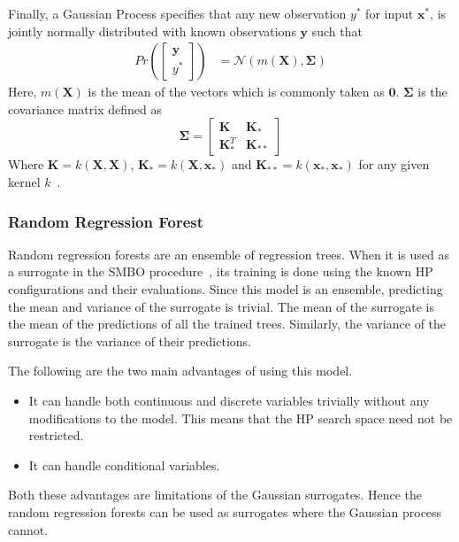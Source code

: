 \documentclass[12pt, twoside, ngerman]{report}
\begin{document}
Finally,  a Gaussian Process specifies that any new observation $y^*$ for input $\textbf{x}^*$,  is jointly normally distributed with known observations $\textbf{y}$ such that
\begin{align}
    Pr\left( \begin{bmatrix}
           \textbf{y} \\
           y^*
         \end{bmatrix}
         \right)
         &=  \mathcal{N}\left(m(\textbf{X}), \mathbf{\Sigma}\right)
\end{align}
Here, $m(\textbf{X})$ is the mean of the vectors which is commonly taken as $\textbf{0}$.
$\mathbf{\Sigma}$ is the covariance matrix defined as
$$
\mathbf{\Sigma} = \begin{bmatrix}
           \textbf{K} & \textbf{K}_* \\
           \textbf{K}_*^T & \textbf{K}_{**}
         \end{bmatrix}
$$
  Where $\textbf{K} = k(\textbf{X}, \textbf{X})$,  $\textbf{K}_*  =  k(\textbf{X}, \textbf{x}_*)$ and $\textbf{K}_{**} = k(\textbf{x}_*,  \textbf{x}_*)$ for any given kernel $k$~\cite{GPTutorial}.

\subsubsection{Random Regression Forest}
Random regression forests are an ensemble of regression trees.
When it is used as a surrogate in the SMBO procedure~\cite{SMBOPaper},  its training is done using the known HP configurations and their evaluations.
Since this model is an ensemble, predicting the mean and variance of the surrogate is trivial. The mean of the surrogate is the mean of the predictions of all the trained trees. Similarly, the variance of the surrogate is the variance of their predictions.

The following are the two main advantages of using this model.
\begin{itemize}
\item It can handle both continuous and discrete variables trivially without any modifications to the model. This means that the HP search space need not be restricted.
\item It can handle conditional variables.
\end{itemize}

Both these advantages are limitations of the Gaussian surrogates. Hence the random regression forests can be used as surrogates where the Gaussian process cannot.
\end{document}
